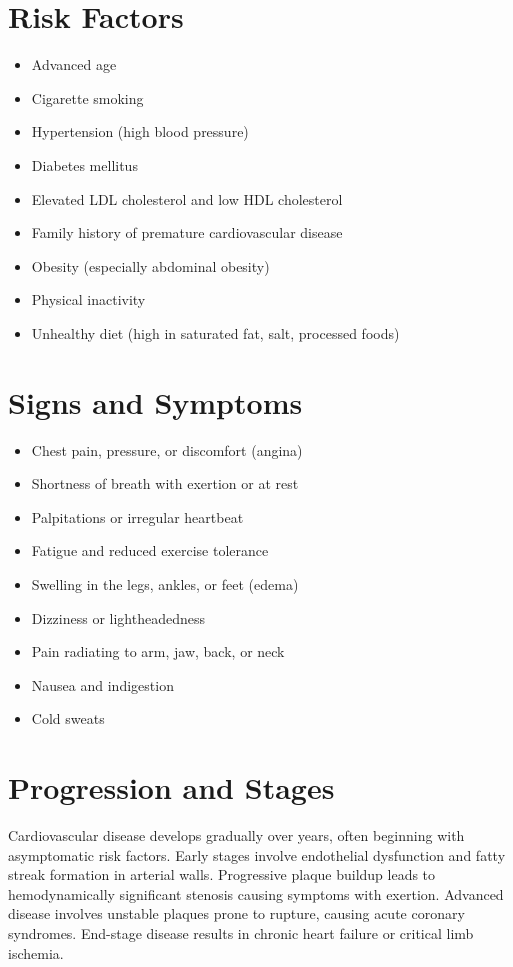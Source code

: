 \section{Risk Factors}

\begin{itemize}[noitemsep]
  \item Advanced age
  \item Cigarette smoking
  \item Hypertension (high blood pressure)
  \item Diabetes mellitus
  \item Elevated LDL cholesterol and low HDL cholesterol
  \item Family history of premature cardiovascular disease
  \item Obesity (especially abdominal obesity)
  \item Physical inactivity
  \item Unhealthy diet (high in saturated fat, salt, processed foods)
\end{itemize}

\section{Signs and Symptoms}

\begin{itemize}[noitemsep]
  \item Chest pain, pressure, or discomfort (angina)
  \item Shortness of breath with exertion or at rest
  \item Palpitations or irregular heartbeat
  \item Fatigue and reduced exercise tolerance
  \item Swelling in the legs, ankles, or feet (edema)
  \item Dizziness or lightheadedness
  \item Pain radiating to arm, jaw, back, or neck
  \item Nausea and indigestion
  \item Cold sweats
\end{itemize}

\section{Progression and Stages}
Cardiovascular disease develops gradually over years, often beginning with asymptomatic risk factors. Early stages involve endothelial dysfunction and fatty streak formation in arterial walls. Progressive plaque buildup leads to hemodynamically significant stenosis causing symptoms with exertion. Advanced disease involves unstable plaques prone to rupture, causing acute coronary syndromes. End-stage disease results in chronic heart failure or critical limb ischemia.

